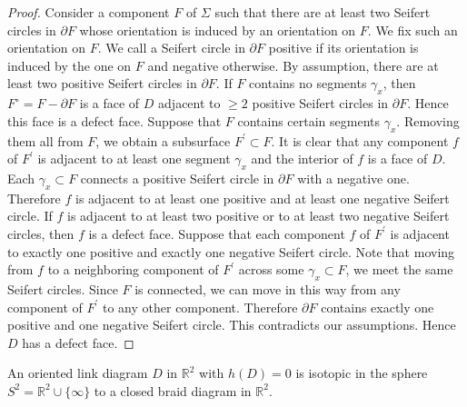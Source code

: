 \begin{proof}
  Consider a component $F$ of $\Sigma$ such that there are at least two Seifert circles in $\partial F$ whose orientation is induced by an orientation on $F$. We fix such an orientation on $F$. We call a Seifert circle in $\partial F$ positive if its orientation is induced by the one on $F$ and negative otherwise. By assumption, there are at least two positive Seifert circles in $\partial F$. If $F$ contains no segments $\gamma_x$, then $F^{\circ} = F - \partial F$ is a face of $D$ adjacent to $\geq 2$ positive Seifert circles in $\partial F$. Hence this face is a defect face. Suppose that $F$ contains certain segments $\gamma_x$. Removing them all from $F$, we obtain a subsurface $F^{\prime}\subset F$. It is clear that any component $f$ of $F^{\prime}$ is adjacent to at least one segment $\gamma_x$ and the interior of $f$ is a face of $D$. Each $\gamma_x \subset F$ connects a positive Seifert circle in $\partial F$ with a negative one. Therefore $f$ is adjacent to at least one positive and at least one negative Seifert circle. If $f$ is adjacent to at least two positive or to at least two negative Seifert circles, then $f$ is a defect face. Suppose that each component $f$ of $F^{\prime}$ is adjacent to exactly one positive and exactly one negative Seifert circle. Note that moving from $f$ to a neighboring component of $F^{\prime}$ across some $\gamma_x\subset F$, we meet the same Seifert circles. Since $F$ is connected,
we can move in this way from any component of $F^{\prime}$ to any other component. Therefore $\partial F$ contains exactly one positive and one negative Seifert circle. This contradicts our assumptions. Hence $D$ has a defect face.
\end{proof}

\begin{lemma}
\label{l3}
An oriented link diagram $D$ in $\mathbb{R}^2$ with $h(D) = 0$ is isotopic in the sphere $S^2 = \mathbb{R}^2 \cup \{\infty\}$ to a closed braid diagram in $\mathbb{R}^2$.
\end{lemma}

